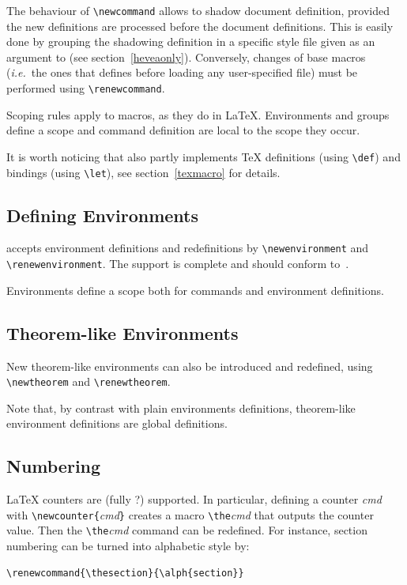 The behaviour of \verb+\newcommand+ allows to shadow document
definition, provided the new definitions are processed before the
document definitions.
This is easily done by grouping the shadowing definition  in a
specific style file given as an argument to \hevea{} (see section~\ref{heveaonly}).
Conversely, changes of base macros (\emph{i.e.}\ the ones that \hevea{}
defines before loading any user-specified file) must be performed
using \verb+\renewcommand+.



Scoping rules apply to macros, as they do in \LaTeX{}.
Environments and groups define a scope and command definition
are local to the scope they occur.

It is worth noticing that \hevea{} also partly implements \TeX{} definitions
(using \verb+\def+) and bindings (using \verb+\let+), see
section~\ref{texmacro} for details.


\subsection{Defining Environments}
\hevea{} accepts environment definitions and redefinitions
by \verb+\newenvironment+ and \verb+\renewenvironment+.
The support is complete and should conform
to~\cite[Sections~C.8.2]{latex}.


Environments define a scope both for commands and environment
definitions.


\subsection{Theorem-like Environments}
New theorem-like environments can also be introduced and redefined,
using \verb+\newtheorem+ and \verb+\renewtheorem+.

Note that, by contrast with plain environments definitions,
theorem-like environment definitions are global definitions.

\subsection{Numbering}
\LaTeX{} counters are (fully ?) supported.
In particular, defining a counter \textit{cmd} with
\verb+\newcounter{+\textit{cmd}\verb+}+ creates a macro
\verb+\the+\textit{cmd} that outputs the counter value.
Then the \verb+\the+\textit{cmd} command can be redefined.
For instance, section numbering can be turned into alphabetic style by:
\begin{verbatim}
\renewcommand{\thesection}{\alph{section}}
\end{verbatim}

